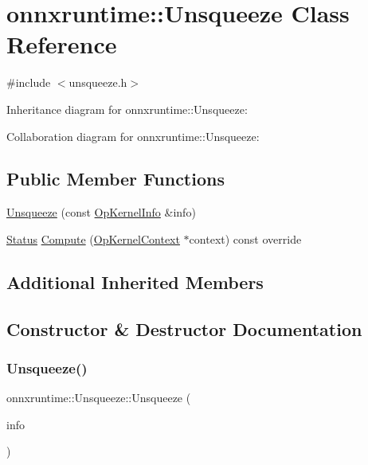 \hypertarget{classonnxruntime_1_1Unsqueeze}{}\section{onnxruntime\+:\+:Unsqueeze Class Reference}
\label{classonnxruntime_1_1Unsqueeze}


{\ttfamily \#include $<$unsqueeze.\+h$>$}



Inheritance diagram for onnxruntime\+:\+:Unsqueeze\+:


Collaboration diagram for onnxruntime\+:\+:Unsqueeze\+:
\subsection*{Public Member Functions}
\begin{DoxyCompactItemize}
\item 
\mbox{\hyperlink{classonnxruntime_1_1Unsqueeze_a132c7d0d5c925530e20f460aab8b3a4b}{Unsqueeze}} (const \mbox{\hyperlink{classonnxruntime_1_1OpKernelInfo}{Op\+Kernel\+Info}} \&info)
\item 
\mbox{\hyperlink{classonnxruntime_1_1common_1_1Status}{Status}} \mbox{\hyperlink{classonnxruntime_1_1Unsqueeze_ae18f5f6ee17799679d6371786a39ca2d}{Compute}} (\mbox{\hyperlink{classonnxruntime_1_1OpKernelContext}{Op\+Kernel\+Context}} $\ast$context) const override
\end{DoxyCompactItemize}
\subsection*{Additional Inherited Members}


\subsection{Constructor \& Destructor Documentation}
\mbox{\label{classonnxruntime_1_1Unsqueeze_a132c7d0d5c925530e20f460aab8b3a4b}} 
\subsubsection{\texorpdfstring{Unsqueeze()}{Unsqueeze()}}
{\footnotesize\ttfamily onnxruntime\+::\+Unsqueeze\+::\+Unsqueeze (\begin{DoxyParamCaption}\item[{const \mbox{\hyperlink{classonnxruntime_1_1OpKernelInfo}{Op\+Kernel\+Info}} \&}]{info }\end{DoxyParamCaption})\hspace{0.3cm}{\ttfamily [inline]}}



